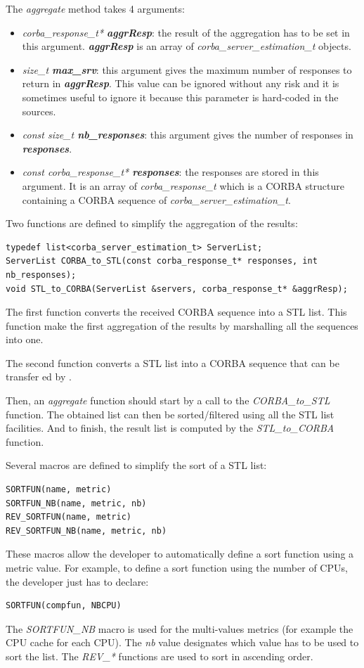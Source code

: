 \noindent The \textit{aggregate} method takes 4 arguments:
\begin{itemize}
  \item \textit{corba\_response\_t* \bf aggrResp}: the result of the aggregation
    has to be set in this argument. \textit{\bf aggrResp} is an array of
    \textit{corba\_server\_estimation\_t} objects. 
  \item \textit{size\_t \bf max\_srv}: this argument gives the maximum number
    of responses to return in \textit{\bf aggrResp}. This value can be ignored
    without any risk and it is sometimes useful to ignore it because this
    parameter is hard-coded in the \diet sources.
  \item \textit{const size\_t \bf nb\_responses}: this argument gives the number
    of responses in \textit{\bf responses}.
  \item \textit{const corba\_response\_t* \bf responses}: the responses are
    stored in this argument. It is an array of \textit{corba\_response\_t}
    which is a CORBA structure containing a CORBA sequence of
    \textit{corba\_server\_estimation\_t}.
\end{itemize}

\noindent Two functions are defined to simplify the aggregation of the results:
\begin{verbatim}
typedef list<corba_server_estimation_t> ServerList;
ServerList CORBA_to_STL(const corba_response_t* responses, int nb_responses);
void STL_to_CORBA(ServerList &servers, corba_response_t* &aggrResp);
\end{verbatim}
The first function converts the received CORBA sequence into a STL list. This
function make the first aggregation of the results by marshalling all the
sequences into one.

\noindent The second function converts a STL list into a CORBA sequence that
can be transfer ed by \diet.

Then, an \textit{aggregate} function should start by a call to the
\textit{CORBA\_to\_STL} function. The obtained list can then be sorted/filtered
using all the STL list facilities. And to finish, the result list is computed
by the \textit{STL\_to\_CORBA} function.

Several macros are defined to simplify the
sort of a STL list:
\begin{verbatim}
SORTFUN(name, metric)
SORTFUN_NB(name, metric, nb)
REV_SORTFUN(name, metric)
REV_SORTFUN_NB(name, metric, nb)
\end{verbatim}
These macros allow the developer to automatically define a sort function
using a metric value. For example, to define a sort function using the
number of CPUs, the developer just has to declare:
\begin{verbatim}
SORTFUN(compfun, NBCPU)
\end{verbatim}
The \textit{SORTFUN\_NB} macro is used for the multi-values metrics (for
example the CPU cache for each CPU). The \textit{nb} value designates which
value has to be used to sort the list.
The \textit{REV\_*} functions are used to sort in ascending order.

